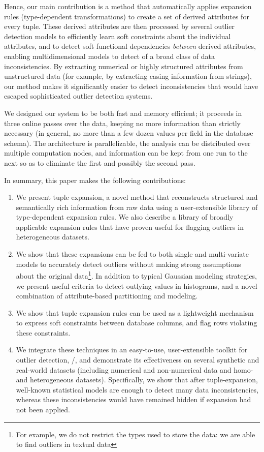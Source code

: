 Hence, our main contribution is a method that automatically applies expansion rules (type-dependent transformations) to create a set of derived attributes for every tuple. These derived attributes are then processed by several outlier detection models to efficiently learn soft constraints about the individual attributes, and to detect soft functional dependencies \textit{between} derived attributes, enabling multidimensional models to detect of a broad class of data inconsistencies. By extracting numerical or highly structured attributes from unstructured data (for example, by extracting casing information from strings), our method makes it significantly easier to detect inconsistencies that would have escaped sophisticated outlier detection systems.

We designed our system to be both fast and memory efficient; it proceeds in three online passes over the data, keeping no more information than strictly necessary (in general, no more than a few dozen values per field in the database schema). The architecture is parallelizable, the analysis can be distributed over multiple computation nodes, and information can be kept from one run to the next so as to eliminate the first and possibly the second pass.

In summary, this paper makes the following contributions:
\begin{enumerate}

\item We present tuple expansion, a novel method that reconstructs structured and semantically rich information from raw data using a user-extensible library of type-dependent expansion rules.
We also describe a library of broadly applicable expansion rules that have proven useful for flagging outliers in heterogeneous datasets.
\item We show that these expansions can be fed to both single and multi-variate models to accurately detect outliers without making strong assumptions about the original data\footnote{For example, we do not restrict the types used to store the data: we are able to find outliers in textual data}. In addition to typical Gaussian modeling strategies, we present useful criteria to detect outlying values in histograms, and a novel combination of attribute-based partitioning and modeling.
\item We show that tuple expansion rules can be used as a lightweight mechanism to express soft constraints between database columns, and flag rows violating these constraints.
\item We integrate these techniques in an easy-to-use, user-extensible toolkit for outlier detection, \dBoost/, and demonstrate its effectiveness on several synthetic and real-world datasets (including numerical and non-numerical data and homo- and heterogeneous datasets).
Specifically, we show that after tuple-expansion, well-known statistical models are enough to detect many data inconsistencies, whereas these inconsistencies would have remained hidden if expansion had not been applied.
\end{enumerate}

